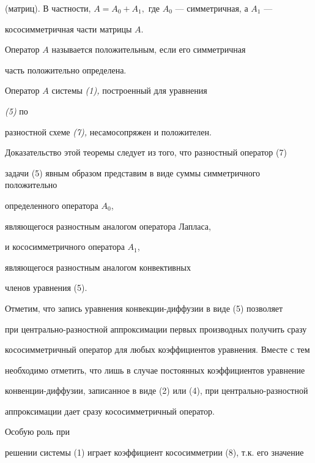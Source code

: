 (матриц). В частности, $A=A_0+A_1,$ где $A_0$ --- симметричная, а $A_1$ --- 


кососимметричная части матрицы $A$. 


 


\begin{defn} Оператор $A$ называется положительным, если его симметричная 


часть положительно определена. 


\end{defn} 


\begin{thm} Оператор $A$ системы {\em (1),} построенный для уравнения 


{\em (5)} по 


разностной схеме {\em (7),} несамосопряжен и положителен. 


\end{thm} 


Доказательство этой теоремы следует из того, что разностный оператор (7) 


задачи (5) явным образом представим в виде суммы симметричного положительно 


определенного оператора $A_0$, 


являющегося разностным аналогом оператора Лапласа, 


и кососимметричного оператора $A_1$, 


являющегося разностным аналогом конвективных 


членов уравнения (5). 


 


Отметим, что запись уравнения конвекции-диффузии в виде (5) позволяет 


при центрально-разностной аппроксимации первых производных получить сразу 


кососимметричный оператор для любых коэффициентов уравнения. Вместе с тем 


необходимо отметить, что лишь в случае постоянных коэффициентов уравнение 


конвенции-диффузии, записанное в виде (2) или (4), при центрально-разностной 


аппроксимации дает сразу кососимметричный оператор.  


 


Особую роль при 


решении системы (1) играет коэффициент кососимметрии (8), т.к. его значение 


